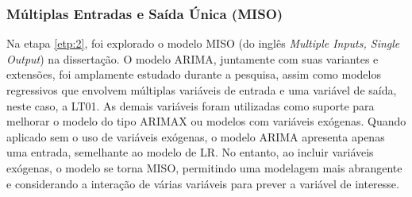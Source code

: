 \subsubsection{M\'ultiplas Entradas e Sa\'ida \'Unica (MISO)}

Na etapa \ref{etp:2}, foi explorado o modelo MISO (do inglês \textit{Multiple Inputs, Single Output}) na dissertação. O modelo ARIMA, juntamente com suas variantes e extensões, foi amplamente estudado durante a pesquisa, assim como modelos regressivos que envolvem múltiplas variáveis de entrada e uma variável de saída, neste caso, a LT01. As demais variáveis foram utilizadas como suporte para melhorar o modelo do tipo ARIMAX ou modelos com variáveis exógenas. Quando aplicado sem o uso de variáveis exógenas, o modelo ARIMA apresenta apenas uma entrada, semelhante ao modelo de LR. No entanto, ao incluir variáveis exógenas, o modelo se torna MISO, permitindo uma modelagem mais abrangente e considerando a interação de várias variáveis para prever a variável de interesse.